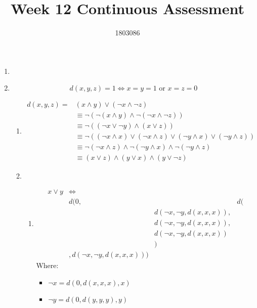 \documentclass{article}
\title{Week 12 Continuous Assessment}
\author{1803086}
\begin{document}
\maketitle
\begin{enumerate}
  \item

  \item
        \[
        d(x,y,z) = 1 \Longleftrightarrow x = y = 1 \text{ or } x = z = 0
        \]

        \begin{enumerate}
          \item
                \begin{align*}
                  d(x,y,z) = &(x \wedge y) \vee (\neg x \wedge \neg z) \\
                  &\equiv \neg ( \neg ( x \wedge y ) \wedge \neg (\neg x \wedge \neg z) ) \\
                  &\equiv \neg ((\neg x \vee \neg y) \wedge (x \vee z)) \\
                  &\equiv \neg ((\neg x \wedge x) \vee (\neg x \wedge z) \vee (\neg y \wedge x) \vee (\neg y \wedge z)) \\
                  &\equiv \neg (\neg x \wedge z) \wedge \neg ( \neg y \wedge x ) \wedge \neg (\neg y \wedge z) \\
                  &\equiv (x \vee z) \wedge (y \vee x) \wedge (y \vee \neg z)
                \end{align*}

          \item
                \begin{enumerate}

                  \item
                        \begin{align*}
                          x \vee y &\Longleftrightarrow \\
                          & d(0, && d(\\
                                && d(\neg x,\neg y,d(x,x,x)),\\
                                && d(\neg x,\neg y,d(x,x,x)),\\
                                && d(\neg x,\neg y,d(x,x,x)) \\
                          &&) \\
                         &,d(\neg x,\neg y,d(x,x,x)))
                        \end{align*}
                        Where:
                        \begin{itemize}
                          \item $\neg x = d(0,d(x,x,x),x)$
                          \item $\neg y = d(0,d(y,y,y),y)$
                        \end{itemize}


\end{enumerate}
\end{enumerate}
\end{enumerate}
\end{document}
